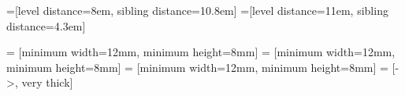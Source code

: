 \begin{frame}
\begin{adjustwidth}{-2.5em}{-2.5em}

=[level distance=8em, sibling distance=10.8em]
=[level distance=11em, sibling distance=4.3em]

 = [minimum width=12mm, minimum height=8mm]
 = [minimum width=12mm, minimum height=8mm]
 = [minimum width=12mm, minimum height=8mm]
 = [->, very thick]

\vspace{-2mm}

\vspace{5mm}


\end{adjustwidth}
\end{frame}

